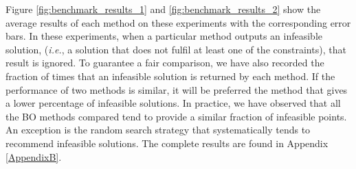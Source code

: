 Figure \ref{fig:benchmark_results_1} and \ref{fig:benchmark_results_2} show the average results of each method on these
experiments with the corresponding error bars. In these experiments, when a particular method outputs an infeasible solution,
(\emph{i.e.}, a solution that does not fulfil at least one of the constraints), that result is ignored. To guarantee a
fair comparison, we have also recorded the fraction of times that an infeasible solution is returned by each method.
If the performance of two methods is similar, it will be preferred the method that gives a lower percentage of
infeasible solutions. In practice, we have observed that all the BO methods compared tend to provide a similar
fraction of infeasible points. An exception is the random search strategy that systematically tends to recommend
infeasible solutions. The complete results are found in Appendix \ref{AppendixB}.

